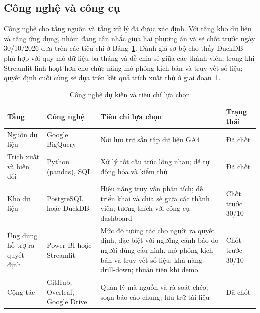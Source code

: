 \subsection{Công nghệ và công cụ}
\label{subsec:cong-nghe}

Công nghệ cho tầng nguồn và tầng xử lý đã được xác định. Với tầng kho dữ liệu và tầng
ứng dụng, nhóm đang cân nhắc giữa hai phương án và sẽ chốt trước ngày 30/10/2026 dựa
trên các tiêu chí ở Bảng~\ref{tab:cong-nghe}. Đánh giá sơ bộ cho thấy DuckDB phù hợp
với quy mô dữ liệu ba tháng và dễ chia sẻ giữa các thành viên, trong khi Streamlit linh
hoạt hơn cho chức năng mô phỏng kịch bản và truy vết số liệu; quyết định cuối cùng sẽ
dựa trên kết quả trích xuất thử ở giai đoạn~1.

\begin{table}[htbp]
    \centering
    \small
    \caption{Công nghệ dự kiến và tiêu chí lựa chọn}
    \label{tab:cong-nghe}
    \begin{tabularx}{\textwidth}{|>{\raggedright\arraybackslash}p{2.4cm}
                                 |>{\raggedright\arraybackslash}p{3.0cm}
                                 |>{\raggedright\arraybackslash}X
                                 |>{\raggedright\arraybackslash}p{1.8cm}|}
        \hline
        \textbf{Tầng} & \textbf{Công nghệ} & \textbf{Tiêu chí lựa chọn}
            & \textbf{Trạng thái} \\
        \hline
        Nguồn dữ liệu & Google BigQuery
            & Nơi lưu trữ sẵn tập dữ liệu GA4 & Đã chốt \\
        \hline
        Trích xuất và biến đổi & Python (pandas), SQL
            & Xử lý tốt cấu trúc lồng nhau; dễ tự động hóa và kiểm thử & Đã chốt \\
        \hline
        Kho dữ liệu & PostgreSQL hoặc DuckDB
            & Hiệu năng truy vấn phân tích; dễ triển khai và chia sẻ giữa các thành
              viên; tương thích với công cụ dashboard & Chốt trước 30/10 \\
        \hline
        Ứng dụng hỗ trợ ra quyết định & Power BI hoặc Streamlit
            & Mức độ tương tác cho người ra quyết định, đặc biệt với ngưỡng cảnh báo
              do người dùng cấu hình, mô phỏng kịch bản và truy vết số liệu; khả năng
              drill-down; thuận tiện khi demo & Chốt trước 30/10 \\
        \hline
        Cộng tác & GitHub, Overleaf, Google Drive
            & Quản lý mã nguồn và rà soát chéo; soạn báo cáo chung; lưu trữ tài liệu
            & Đã chốt \\
        \hline
    \end{tabularx}
\end{table}
\newpage
